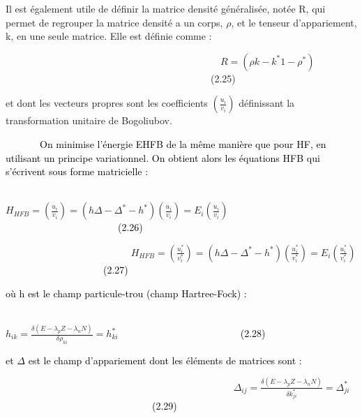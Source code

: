 \documentclass[a4paper]{article}
\begin{document}
Il est également utile de définir la matrice densité généralisée, notée R, qui permet de regrouper la matrice densité a
un corps, $\rho $, et le tenseur d’appariement, k, en une seule matrice. Elle est définie comme :

\ \ \ \ \ \ \ \ \ \ \ \ \ \ \ \ \ \ \ \ \ \ \ \ \ \ \ \ \ \ \ \ \ \ \ \ \ \ \ \ \ \ \ \  $R=\left(\rho k-k^{\ast }1-\rho
^{\ast }\right)$\ \ \ \ \ \ \ \ \ \ \ \ \ \ \ \ \ \ \ \ \ \ \ \ \ \ \ \ \ \ \ \ \ \ \ \ \ \ \ \ \ \ (2.25)

et dont les vecteurs propres sont les coefficients $\left(\frac{u_i}{v_i}\right)$ définissant la transformation unitaire
de Bogoliubov.


\bigskip

\textcolor{black}{\ \ \ \ \ \ \ On minimise l’énergie EHFB de la même manière que pour HF, en utilisant un principe
variationnel. On obtient alors les équations HFB qui s’écrivent sous forme matricielle :}


\bigskip

\textcolor{black}{\ \ \ \ \ \ \ \ \ \ \ \ \ \ \ \ \ \ \ \ \ \ \ \ \ \ \ \ \ \ \ \ \ \ }
$H_{\mathit{HFB}}=\left(\frac{u_i}{v_i}\right)=\left(h{\Delta}-{\Delta}^{\ast }-h^{\ast
}\right)\left(\frac{u_i}{v_i}\right)=E_i\left(\frac{u_i}{v_i}\right)$\textcolor{black}{\ \ \ \ \ \ \ \ \ \ \ \ \ \ \ \ \ \ \ \ \ \ \ (2.26)}

\textcolor{black}{\ \ \ \ \ \ \ \ \ \ \ \ \ \ \ \ \ \ \ \ \ \ \ \ \ } $H_{\mathit{HFB}}=\left(\frac{u_i^{\ast
}}{v_i^{\ast }}\right)=\left(h{\Delta}-{\Delta}^{\ast }-h^{\ast }\right)\left(\frac{u_i^{\ast }}{v_i^{\ast
}}\right)=E_i\left(\frac{u_i^{\ast }}{v_i^{\ast
}}\right)$\textcolor{black}{\ \ \ \ \ \ \ \ \ \ \ \ \ \ \ \ \ \ \ \ (2.27)}

\textcolor{black}{où h est le champ particule-trou (champ Hartree-Fock) :}

\textcolor{black}{\ \ \ \ \ \ \ \ \ \ \ \ \ \ \ \ \ \ \ \ \ \ \ \ \ \ \ \ \ \ \ \ \ \ \ \ \ \ \ \ \ \ \ \ \ \ \ \ \ \ \ }
$h_{\mathit{ik}}=\frac{\delta (E-\lambda _pZ-\lambda _nN)}{\delta \rho _{\mathit{ki}}}=h_{\mathit{ki}}^{\ast
}$\textcolor{black}{\ \ \ \ \ \ \ \ \ \ \ \ \ \ \ \ \ \ \ \ \ \ \ \ \ (2.28)}

\textcolor{black}{et $\Delta $ est le champ d’appariement dont les éléments de matrices sont :}

\textcolor{black}{\ \ \ \ \ \ \ \ \ \ \ \ \ \ \ \ \ \ \ \ \ \ \ \ \ \ \ \ \ \ \ \ \ \ \ \ \ \ \ \ \ \ \ \ \ \ }
${\Delta}_{\mathit{ij}}=\frac{\delta (E-\lambda _pZ-\lambda _nN)}{\delta k_{\mathit{ji}}^{\ast
}}={\Delta}_{\mathit{ji}}^{\ast }$\textcolor{black}{\ \ \ \ \ \ \ \ \ \ \ \ \ \ \ \ \ \ \ \ \ \ \ \ \ \ \ \ \ \ (2.29)}
\end{document}
